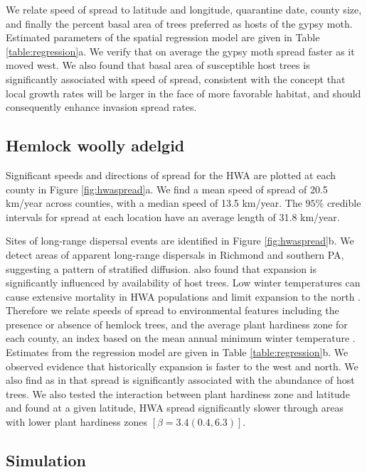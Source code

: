 \documentclass[12pt]{article}
\begin{document}
We relate speed of spread to latitude and longitude, quarantine date, county size, and finally the percent basal area of trees preferred as hosts of the gypsy moth. Estimated parameters of the spatial regression model are given in Table \ref{table:regression}a. We verify that on average the gypsy moth spread faster as it moved west. We also found that basal area of susceptible host trees is significantly associated with speed of spread, consistent with the concept that local growth rates will be larger in the face of more favorable habitat, and should consequently enhance invasion spread rates.



\subsection{Hemlock woolly adelgid}

Significant speeds and directions of spread for the HWA are plotted at each county in Figure \ref{fig:hwaspread}a. We find a mean speed of spread of 20.5 km/year across counties, with a median speed of 13.5 km/year. The $95\%$ credible intervals for spread at each location have an average length of 31.8 km/year.

Sites of long-range dispersal events are identified in Figure \ref{fig:hwaspread}b. We detect areas of apparent long-range dispersals in Richmond and southern PA, suggesting a pattern of stratified diffusion. \cite{morin2009anisotropic} also found that expansion is significantly influenced by availability of host trees. Low winter temperatures can cause extensive mortality in HWA populations and limit expansion to the north \citep{trotter2009variation}. Therefore we relate speeds of spread to environmental features including the presence or absence of hemlock trees, and the average plant hardiness zone for each county, an index based on the mean annual minimum winter temperature \citep{cathey1990usda}. Estimates from the regression model are given in Table \ref{table:regression}b. We observed evidence that historically expansion is faster to the west and north. We also find as in \cite{morin2009anisotropic} that spread is significantly associated with the abundance of host trees. We also tested the interaction between plant hardiness zone and latitude and found at a given latitude, HWA spread significantly slower through areas with lower plant hardiness zones $[ \beta = 3.4 (0.4, 6.3) ]$.


\subsection{Simulation}
\end{document}
